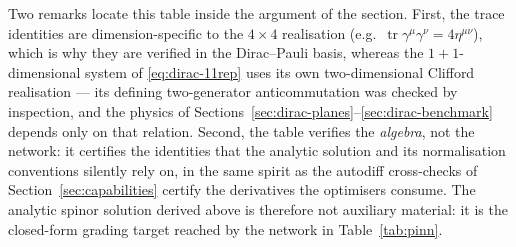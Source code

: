 Two remarks locate this table inside the argument of the section. First, the
trace identities are dimension-specific to the $4\times4$ realisation
(e.g.\ $\operatorname{tr}\gamma^{\mu}\gamma^{\nu} = 4\eta^{\mu\nu}$),
which is why they are verified in the Dirac--Pauli basis, whereas the
$1+1$-dimensional system of \eqref{eq:dirac-11rep} uses its own
two-dimensional Clifford realisation --- its defining two-generator
anticommutation was checked by inspection, and the physics of
Sections~\ref{sec:dirac-planes}--\ref{sec:dirac-benchmark} depends only on
that relation. Second, the table verifies the \emph{algebra}, not the
network: it certifies the identities that the analytic solution and its
normalisation conventions silently rely on, in the same spirit as the
autodiff cross-checks of Section~\ref{sec:capabilities} certify the
derivatives the optimisers consume. The analytic spinor solution derived
above is therefore not auxiliary material: it is the closed-form grading
target reached by the network in Table~\ref{tab:pinn}.


